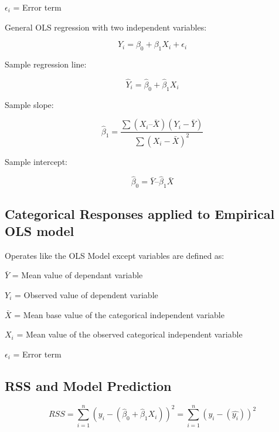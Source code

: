 \documentclass[preprint,12pt,times]{elsarticle}
\begin{document}
$\epsilon_i$ = Error term

\noindent General OLS regression with two independent variables:
\begin{large}
\begin{equation}
Y_i = \beta_0 + \beta_1 X_i + \epsilon_i
\end{equation}
\end{large}
Sample regression line:
\begin{large}
\begin{equation}
\hat{Y}_i = \hat{\beta}_0 + \hat{\beta}_1 X_i
\end{equation}
\end{large}
Sample slope:
\begin{large}
\begin{equation}
\hat{\beta}_1 = \frac{\sum(X_i – \bar{X}) (Y_i - \bar{Y})}{\sum(X_i - \bar{X})^2}
\end{equation}
\end{large}
Sample intercept:
\begin{large}
\begin{equation}
\hat{\beta}_0 = \bar{Y}–\hat{\beta}_1 \bar{X}
\end{equation}
\end{large}
\subsection{
\textbf{Categorical Responses applied to Empirical OLS model}}

Operates like the OLS Model except variables are defined as:

$\bar{Y}$ = Mean value of dependant variable

$Y_i$ = Observed value of dependent variable

$\bar{X}$ = Mean base value of the categorical independent variable

$X_i$ = Mean value of the observed categorical independent variable

$\epsilon_i$ = Error term
\subsection{
\textbf{RSS and Model Prediction}}
\begin{large}
\begin{equation}
RSS = \sum_{i=1}^{n}(y_i-(\hat{\beta}_0 + \hat{\beta}_1 X_i))^2 = \sum_{i=1}^{n}(y_i-(\hat{y_i}))^2
\end{equation}
\end{large}
\end{document}
